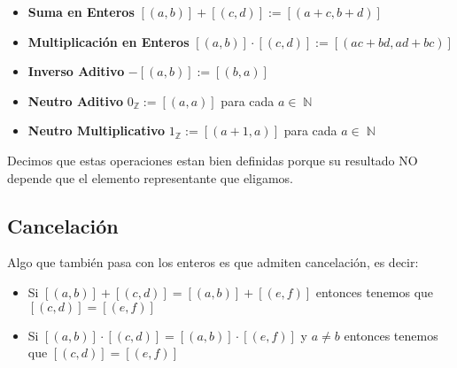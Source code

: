 \documentclass[12pt, fleqn]{report}                             %
\DeclareMathOperator \Naturals  {\mathbb{N}}                     %
\DeclareMathOperator \Integers  {\mathbb{Z}}                     %
\begin{document}
            \begin{itemize}
                \item
                    \textbf{Suma en Enteros}
                    $[(a,b)] + [(c,d)] := [(a+c, b+d)]$

                \item
                    \textbf{Multiplicación en Enteros}
                    $[(a,b)] \cdot [(c,d)] := [(ac+bd, ad+bc)]$

                \item
                    \textbf{Inverso Aditivo}
                    $-[(a,b)] := [(b,a)]$

                \item
                    \textbf{Neutro Aditivo}
                    $0_{\Integers} := [(a,a)]$ para cada $a \in \Naturals$

                 \item
                    \textbf{Neutro Multiplicativo}
                    $1_{\Integers} := [(a+1,a)]$ para cada $a \in \Naturals$
            \end{itemize}


            Decimos que estas operaciones estan bien definidas porque su resultado NO depende que 
            el elemento representante que eligamos.


            \subsection*{Cancelación}

                Algo que también pasa con los enteros es que admiten cancelación, es decir:
                \begin{itemize}
                    \item
                        Si  $[(a,b)] + [(c,d)] = [(a,b)] + [(e,f)]$ entonces tenemos que
                        $[(c,d)] = [(e,f)]$

                    \item
                        Si  $[(a,b)] \cdot [(c,d)] = [(a,b)] \cdot [(e,f)]$ y $a \neq b$ entonces
                        tenemos que $[(c,d)] = [(e,f)]$
                \end{itemize}




\end{document}

